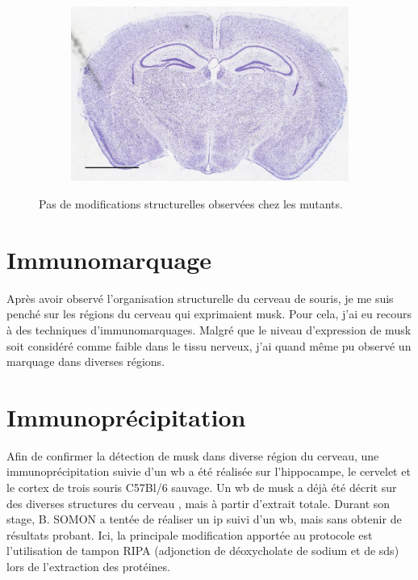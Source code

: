 \begin{figure}[h]
\begin{center}
\begin{subfigure}[h]{0.49\textwidth}
		\end{subfigure}
		\begin{subfigure}[h]{0.49\textwidth}%
			\caption{}
			\label{fig:MaleMutNissl}
			\includegraphics[width=\textwidth]{./Images/Nissl/MaleMut.jpg}
		\end{subfigure}
	\end{center}
	\caption{Pas de modifications structurelles observées chez les mutants.}
	\label{fig:NisslResultat}
\end{figure}

\section{Immunomarquage}
Après avoir observé l'organisation structurelle du cerveau de souris, je me suis penché sur les régions du cerveau qui exprimaient \gls{musk}. Pour cela, j'ai eu recours à des techniques d'immunomarquages. Malgré que le niveau d'expression de \gls{musk} soit considéré comme faible dans le tissu nerveux, j'ai quand même pu observé un marquage dans diverses régions.

\section{Immunoprécipitation}
\label{sec:IPresultat}
Afin de confirmer la détection de \gls{musk} dans diverse région du cerveau, une immunoprécipitation suivie d'un \gls{wb} a été réalisée sur l'hippocampe, le cervelet et le cortex de trois souris C57Bl/6 sauvage. Un \gls{wb} de \gls{musk} a déjà été décrit sur des diverses structures du cerveau \cite{Garcia-Osta2006}, mais à partir d'extrait totale. Durant son stage, B. SOMON a tentée de réaliser un \gls{ip} suivi d'un \gls{wb}, mais sans obtenir de résultats probant. Ici, la principale modification apportée au protocole est l'utilisation de tampon RIPA (adjonction de déoxycholate de sodium et de \acrshort{sds}) lors de l'extraction des protéines.


